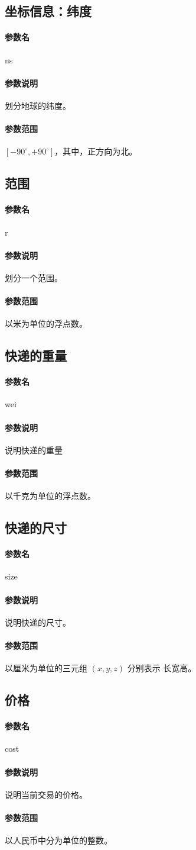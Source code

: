 \documentclass[UTF8]{dingo}
\def\参数名#1{\paragraph{\colorbox[rgb]{0.9,0.5,0.5}{参数名}}#1}
\def\说明{\paragraph{\colorbox[rgb]{0.7,0.7,0.8}{参数说明}}}
\def\范围{\paragraph{\colorbox[rgb]{0.9,0.7,0.7}{参数范围}}}
\begin{document}
\begin{appendices}
        \subsection{坐标信息：纬度}
            \参数名{ns}
            \说明 划分地球的纬度。
            \范围 $[-90^\circ,+90^\circ]$，其中，正方向为北。
        \subsection{范围}
            \参数名{r}
            \说明 划分一个范围。
            \范围 以米为单位的浮点数。
        \subsection{快递的重量}
            \参数名{wei}
            \说明 说明快递的重量
            \范围 以千克为单位的浮点数。
        \subsection{快递的尺寸}
            \参数名{size}
            \说明 说明快递的尺寸。
            \范围 以厘米为单位的三元组 $(x,y,z)$ 分别表示 长宽高。
        \subsection{价格}
            \参数名{cost}
            \说明 说明当前交易的价格。
            \范围 以人民币中分为单位的整数。

\end{appendices}
\end{document}
